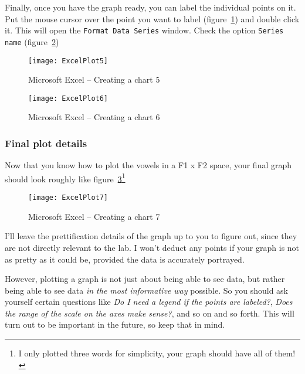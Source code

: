 \documentclass{article}
\newcommand{\soft}[1]{\textsf{#1}}
\newcommand{\softmenu}[1]{\texttt{#1}}
\newcommand{\MSExcel}{\soft{Microsoft\texttrademark{} Excel}}
\begin{document}
Finally, once you have the graph ready, you can label the individual points on it. Put the mouse cursor over the point you want to label (figure~\ref{step4plot}) and double click it. This will open the \softmenu{Format Data Series} window. Check the option \softmenu{Series name} (figure~\ref{step5plot})

\begin{figure}[!tbp]
\caption{\MSExcel{} -- Creating a chart 5}
\label{step4plot}
	\begin{center}
		\texttt{[image: ExcelPlot5]}
	\end{center}
\end{figure}

\begin{figure}[!tbp]
\caption{\MSExcel{} -- Creating a chart 6}
\label{step5plot}
	\begin{center}
		\texttt{[image: ExcelPlot6]}
	\end{center}
\end{figure}

\subsubsection{Final plot details}

Now that you know how to plot the vowels in a F1 x F2 space, your final graph should look roughly like figure~\ref{step6plot}\footnote{I only plotted three words for simplicity, your graph should have all of them!}

\begin{figure}[!tbp]
\caption{\MSExcel{} -- Creating a chart 7}
\label{step6plot}
	\begin{center}
		\texttt{[image: ExcelPlot7]}
	\end{center}
\end{figure}

I'll leave the prettification details of the graph up to you to figure out, since they are not directly relevant to the lab. I won't deduct any points if your graph is not as pretty as it could be, provided the data is accurately portrayed.

However, plotting a graph is not just about being able to see data, but rather being able to see data \emph{in the most informative way} possible. So you should ask yourself certain questions like \emph{Do I need a legend if the points are labeled?}, \emph{Does the range of the scale on the axes make sense?}, and so on and so forth. This will turn out to be important in the future, so keep that in mind.
\end{document}
